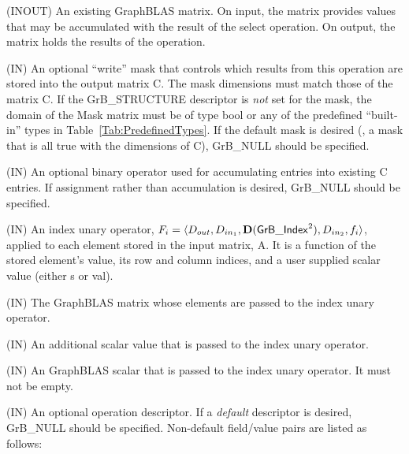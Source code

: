 \begin{itemize}[leftmargin=1.1in]
    \item[{\sf C}]    ({\sf INOUT}) An existing GraphBLAS matrix. On input,
    the matrix provides values that may be accumulated with the result of the
    select operation.  On output, the matrix holds the results of the
    operation.

    \item[{\sf Mask}] ({\sf IN}) An optional ``write'' mask that controls which
    results from this operation are stored into the output matrix {\sf C}. The 
    mask dimensions must match those of the matrix {\sf C}. If the 
    {\sf GrB\_STRUCTURE} descriptor is {\em not} set for the mask, the domain of the 
    {\sf Mask} matrix must be of type {\sf bool} or any of the predefined 
    ``built-in'' types in Table~\ref{Tab:PredefinedTypes}.  If the default
    mask is desired (\ie, a mask that is all {\sf true} with the dimensions of {\sf C}), 
    {\sf GrB\_NULL} should be specified.

    \item[{\sf accum}] ({\sf IN}) An optional binary operator used for accumulating
    entries into existing {\sf C} entries. If assignment rather than accumulation is
    desired, {\sf GrB\_NULL} should be specified.

{\color{red}
   \item[{\sf op}] ({\sf IN}) An index unary operator, 
    $F_i = \langle \mbox{$D_{out}$}, \mbox{$D_{in_{1}}$}, \mathbf{D}({\sf GrB\_Index}^2), \mbox{$D_{in_{2}}$}, f_{i} \rangle$, 
    applied to each element stored in the input matrix, {\sf A}. It is a function 
    of the stored element's value, its row and column indices,
    and a user supplied scalar value (either {\sf s} or {\sf val}).
}

    \item[{\sf A}] ({\sf IN}) The GraphBLAS matrix whose elements are passed 
    to the index unary operator.

    \item[{\sf val}] ({\sf IN}) An additional scalar value that is passed to the 
    index unary operator.

{\color{red}
    \item[{\sf s}] ({\sf IN}) An GraphBLAS scalar that is passed to the 
    index unary operator.  It must not be empty.
}

    \item[{\sf desc}] ({\sf IN}) An optional operation descriptor. If
    a \emph{default} descriptor is desired, {\sf GrB\_NULL} should be
    specified. Non-default field/value pairs are listed as follows:  \\


\end{itemize}
